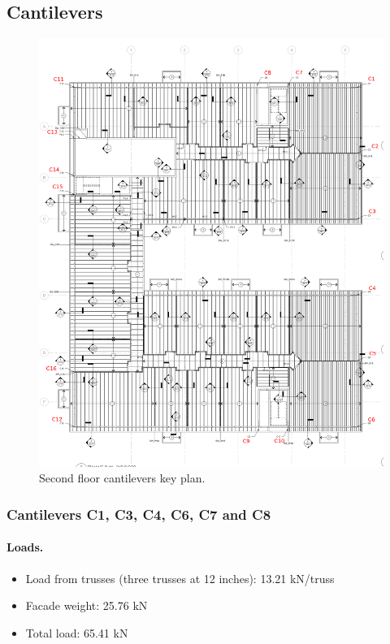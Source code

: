 \subsection{Cantilevers}

\begin{figure}
  \begin{center}
  \includegraphics[width=120mm]{figures/cantilevers/cantilevers_key_plan}
  \end{center}
  \caption{Second floor cantilevers key plan.}\label{fg_2nd_floor_cantilevers_key_plan}
\end{figure}

\subsubsection{Cantilevers C1, C3, C4, C6, C7 and C8}

\paragraph{Loads.}

\begin{itemize}
\item Load from trusses (three trusses at 12 inches): 13.21 kN/truss
\item Facade weight: 25.76 kN
\item Total load: 65.41 kN
\end{itemize}

